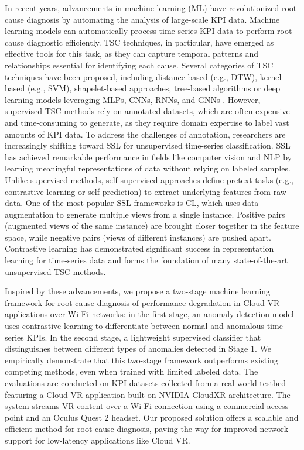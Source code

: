In recent years, advancements in machine learning (ML) have revolutionized root-cause diagnosis by automating the analysis of large-scale KPI data. Machine learning models can automatically process time-series KPI data to perform root-cause diagnostic efficiently. \ac{TSC} techniques, in particular, have emerged as effective tools for this task, as they can capture temporal patterns and relationships essential for identifying each cause. Several categories of TSC techniques have been proposed, including distance-based (e.g., DTW), kernel-based (e.g., SVM), shapelet-based approaches, tree-based algorithms or deep learning models leveraging MLPs, CNNs, RNNs, and GNNs \cite{ismail2019deep, faouzi2022time,mohammadi2024deep}. However, supervised TSC methods rely on annotated datasets, which are often expensive and time-consuming to generate, as they require domain expertise to label vast amounts of KPI data. To address the challenges of annotation, researchers are increasingly shifting toward \ac{SSL} for unsupervised time-series classification. SSL has achieved remarkable performance in fields like computer vision and \ac{NLP} by learning meaningful representations of data without relying on labeled samples. Unlike supervised methods, self-supervised approaches define pretext tasks (e.g., contrastive learning or self-prediction) to extract underlying features from raw data. One of the most popular SSL frameworks is \ac{CL}, which uses data augmentation to generate multiple views from a single instance. Positive pairs (augmented views of the same instance) are brought closer together in the feature space, while negative pairs (views of different instances) are pushed apart. Contrastive learning has demonstrated significant success in representation learning for time-series data and forms the foundation of many state-of-the-art unsupervised TSC methods.  

Inspired by these advancements, we propose a two-stage machine learning framework for root-cause diagnosis of performance degradation in Cloud VR applications over Wi-Fi networks: in the first stage, an anomaly detection model uses contrastive learning to differentiate between normal and anomalous time-series KPIs. In the second stage, a lightweight supervised classifier that distinguishes between different types of anomalies detected in Stage 1. We empirically demonstrate that this two-stage framework outperforms existing competing methods, even when trained with limited labeled data. The evaluations are conducted on KPI datasets collected from a real-world testbed featuring a Cloud VR application built on NVIDIA CloudXR architecture. The system streams VR content over a Wi-Fi connection using a commercial access point and an Oculus Quest 2 headset. Our proposed solution offers a scalable and efficient method for root-cause diagnosis, paving the way for improved network support for low-latency applications like Cloud VR.  

